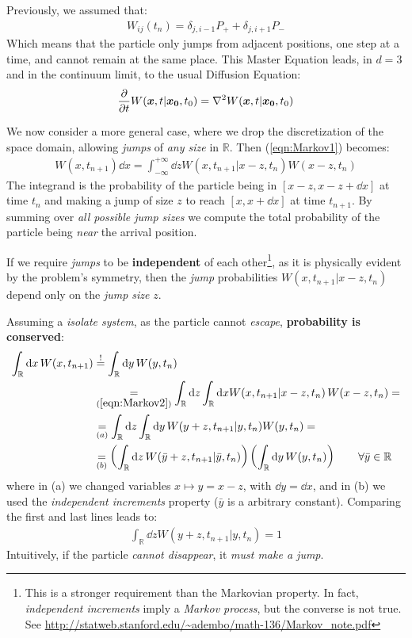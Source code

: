 \documentclass[../template.tex]{subfiles}
\begin{document}
Previously, we assumed that:
\begin{align*}
    W_{ij}(t_n) = \delta_{j,i-1} P_+ + \delta_{j,i+1} P_-
\end{align*}        
Which means that the particle only jumps from adjacent positions, one step at a time, and cannot remain at the same place. This Master Equation leads, in $d=3$ and in the continuum limit, to the usual Diffusion Equation:
\begin{align*}
    \pdv{t} W(\bm{x}, t|\bm{x_0}, t_0) = \nabla^2 W(\bm{x},t | \bm{x_0},t_0)
\end{align*}

We now consider a more general case, where we drop the discretization of the space domain, allowing \textit{jumps} of \textit{any size} in $\mathbb{R}$. Then (\ref{eqn:Markov1}) becomes:
\begin{align}
    \label{eqn:Markov2}
    W(x,t_{n+1}) \dd{x} = \int_{-\infty}^{+\infty} \dd{z} W(x, t_{n+1}|x-z,t_n) W(x-z,t_n)
\end{align}
The integrand is the probability of the particle being in $[x-z,x-z+\dd{x}]$ at time $t_n$ and making a jump of size $z$ to reach $[x,x+\dd{x}]$ at time $t_{n+1}$. By summing over \textit{all possible jump sizes} we compute the total probability of the particle being \textit{near} the arrival position.

If we require \textit{jumps} to be \textbf{independent} of each other\footnote{This is a stronger requirement than the Markovian property. In fact, \textit{independent increments} imply a \textit{Markov process}, but the converse is not true. See \url{http://statweb.stanford.edu/~adembo/math-136/Markov_note.pdf}}, as it is physically evident by the problem's symmetry, then the \textit{jump} probabilities $W(x,t_{n+1}|x-z,t_n)$ depend only on the \textit{jump size} $z$.  

Assuming a \textit{isolate system}, as the particle cannot \textit{escape}, \textbf{probability is conserved}:
\begin{align*}
    \int_{\mathbb{R}} \dd{x} W(x,t_{n+1}) &\overset{!}{=} \int_{\mathbb{R}} \dd{y} W(y,t_n)\\
    &\underset{(\ref{eqn:Markov2})}{=} \int_{\mathbb{R}} \dd{z} \int_{\mathbb{R}} \dd{x W(x,t_{n+1}|x-z,t_n)} W(x-z,t_n) =\\
    &\underset{(a)}{=} \int_{\mathbb{R}} \dd{z} \int_{\mathbb{R}} \dd{y} W(y+z,t_{n+1}|y,t_n) W(y,t_n) =\\
    &\underset{(b)}{=} \left(\int_{\mathbb{R}} \dd{z} W(\bar{y} + z,t_{n+1}|\bar{y},t_n) \right) \left(\int_{\mathbb{R}} \dd{y} W(y,t_n) \right) \qquad \forall \bar{y} \in \mathbb{R}
\end{align*}
where in (a) we changed variables $x \mapsto y=x-z$, with $\dd{y} = \dd{x}$, and in (b) we used the \textit{independent increments} property ($\bar{y}$ is a arbitrary constant). Comparing the first and last lines leads to:
\begin{align*}
    \int_{\mathbb{R}} \dd{z} W(y+z,t_{n+1}|y,t_n) = 1
\end{align*} 
Intuitively, if the particle \textit{cannot disappear}, it \textit{must make a jump}.   
\end{document}
